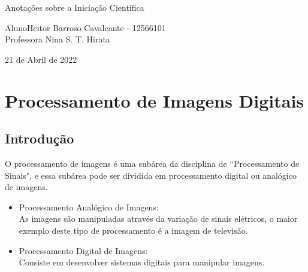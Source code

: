 \documentclass[a4paper, 12pt]{article}
\begin{document}
\begin{titlepage}
	\begin{center}
		\huge{Anotações sobre a Iniciação Científica}

		\vspace{30pt}
		
	\end{center}
	
	\begin{flushleft}
		Aluno\qquad\qquad Heitor Barroso Cavalcante - 12566101\\
		\vspace{10pt}
		Professora \quad Nina S. T. Hirata \\
		  
	\end{flushleft}
	\vspace{30pt}
	\begin{center}
		21 de Abril de 2022
	\end{center}
	\tableofcontents
\end{titlepage}
\thispagestyle{empty}

\newpage
{}

\section{Processamento de Imagens Digitais}
\subsection{Introdução}
O processamento de imagens é uma subárea da disciplina de ``Processamento de Sinais", e essa subárea pode ser dividida em processamento digital ou analógico de imagens.
\begin{itemize}
    \item Processamento Analógico de Imagens:\\
    As imagens são manipuladas através da variação de sinais elétricos, o maior exemplo deste tipo de processamento é a imagem de televisão.
    \item Processamento Digital de Imagens:\\
    Consiste em desenvolver sistemas digitais para manipular imagens.
\end{itemize}
\end{document}
